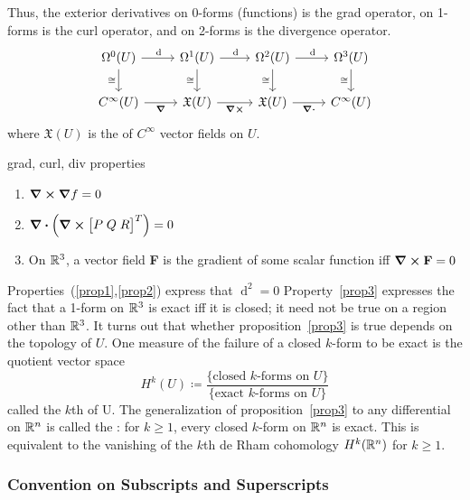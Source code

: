 %
Thus, the exterior derivatives on 0-forms (functions) is the grad operator, on 1-forms is the curl operator, and on 2-forms is the divergence operator.
%
\[
    \begin{tikzcd}
        \Omega^0(U) \arrow{r}{\dif} \arrow[swap]{d}{\cong} & \Omega^1(U) \arrow{r}{\dif} \arrow[swap]{d}{\cong} & \Omega^2(U) \arrow{r}{\dif} \arrow[swap]{d}{\cong} & \Omega^3(U) \arrow[swap]{d}{\cong}  \\
        C^\infty(U) \arrow[swap]{r}{\grad} & \mathfrak{X}(U) \arrow[swap]{r}{\curl} & \mathfrak{X}(U) \arrow[swap]{r}{\div} & C^\infty(U)
    \end{tikzcd}
\]
%
where \(\mathfrak{X}(U)\) is the  of \(C^\infty\) vector fields on \(U\).
%
\begin{proposition}{grad, curl, div properties}{}
    \begin{enumerate}
        \item\label{prop1} \( \curl{\grad{f}} = 0 \)
        \item\label{prop2} \(\div(\curl{ \begin{bmatrix}P \; Q \; R\end{bmatrix} ^T}) = 0\)
        \item\label{prop3} On \(\mathbb{R}^3\), a vector field \textbf{F} is the gradient of some scalar function iff \(\curl{\textbf{F}}=0\)
    \end{enumerate}
\end{proposition}
%
Properties~(\ref{prop1},\ref{prop2}) express that \(\operatorname{d}^2 = 0\)
%
Property~\eqref{prop3} expresses the fact that a 1-form on \(\mathbb{R}^3\) is exact iff it is closed; it need not be true on a region other than \(\mathbb{R}^3\).
%
It turns out that whether proposition~\eqref{prop3} is true depends on the topology of \(U\).
%
One measure of the failure of a closed \(k\)-form to be exact is the quotient vector space
%
\begin{equation}
    H^k(U) \coloneqq \frac{\{\text{closed \(k\)-forms on } U\}}{\{\text{exact \(k\)-forms on }U\}}
\end{equation}
%
called the \(k\)th  of U.
%
The generalization of proposition~\eqref{prop3} to any differential on \(\mathbb{R}^n\) is called the : for \(k \geq 1\), every closed \(k\)-form on \(\mathbb{R}^n\) is exact.
%
This is equivalent to the vanishing of the \(k\)th de Rham cohomology \(H^k(\mathbb{R}^n)\) for \(k \geq 1\).

\subsubsection{Convention on Subscripts and Superscripts}

